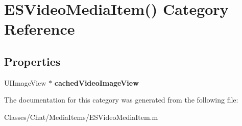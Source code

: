 \hypertarget{category_e_s_video_media_item_07_08}{}\section{E\+S\+Video\+Media\+Item() Category Reference}
\label{category_e_s_video_media_item_07_08}
\subsection*{Properties}
\begin{DoxyCompactItemize}
\item 
\hypertarget{category_e_s_video_media_item_07_08_abd1b8d0e97a48f0a95bf8c6a3531ef85}{}U\+I\+Image\+View $\ast$ {\bfseries cached\+Video\+Image\+View}\label{category_e_s_video_media_item_07_08_abd1b8d0e97a48f0a95bf8c6a3531ef85}

\end{DoxyCompactItemize}


The documentation for this category was generated from the following file\+:\begin{DoxyCompactItemize}
\item 
Classes/\+Chat/\+Media\+Items/E\+S\+Video\+Media\+Item.\+m\end{DoxyCompactItemize}
